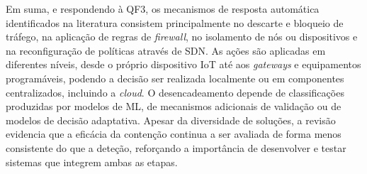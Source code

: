 \documentclass[conference,a4paper]{IEEEtran}
\begin{document}
Em suma, e respondendo à QF3, os mecanismos de resposta automática identificados na literatura consistem principalmente no descarte e bloqueio de tráfego, na aplicação de regras de \textit{firewall}, no isolamento de nós ou dispositivos e na reconfiguração de políticas através de SDN. As ações são aplicadas em diferentes níveis, desde o próprio dispositivo IoT até aos \textit{gateways} e equipamentos programáveis, podendo a decisão ser realizada localmente ou em componentes centralizados, incluindo a \textit{cloud}. O desencadeamento depende de classificações produzidas por modelos de ML, de mecanismos adicionais de validação ou de modelos de decisão adaptativa. Apesar da diversidade de soluções, a revisão evidencia que a eficácia da contenção continua a ser avaliada de forma menos consistente do que a deteção, reforçando a importância de desenvolver e testar sistemas que integrem ambas as etapas.
\end{document}
